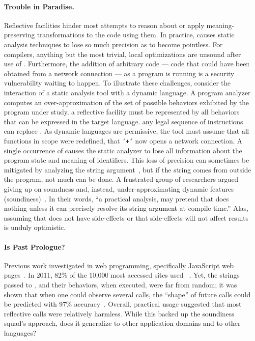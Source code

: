 \documentclass[screen,acmsmall]{acmart}%
\begin{document}
\paragraph{Trouble in Paradise.} Reflective facilities hinder
most attempts to reason about or apply meaning-preserving transformations to the
code using them. In practice, \eval causes static analysis techniques to lose so
much precision as to become pointless. For compilers, anything but the most
trivial, local optimizations are unsound after use of \eval. Furthermore, the
addition of arbitrary code --- code that could have been obtained from a network
connection --- as a program is running is a security vulnerability waiting to
happen. To illustrate these challenges, consider the interaction of a static
analysis tool with a dynamic language. A program analyzer computes an
over-approximation of the set of possible behaviors exhibited by the program
under study, a reflective facility must be represented by all behaviors that can
be expressed in the target language. \ie any legal sequence of instructions can
replace \eval. As dynamic languages are permissive, the tool must assume that
all functions in scope were redefined, \eg that \texttt{`+`} now opens a network
connection. A single occurrence of \eval causes the static analyzer to lose all
information about the program state and meaning of identifiers. This loss of
precision can sometimes be mitigated by analyzing the string
argument~\cite{moller03}, but if the string comes from outside the program, not
much can be done. A frustrated group of researchers argued giving up on
soundness and, instead, under-approximating dynamic features
(soundiness)~\cite{soundy}. In their words, ``a practical analysis, may pretend
that \eval does nothing unless it can precisely resolve its string argument at
compile time.'' Alas, assuming that \eval does not have side-effects or that
side-effects will not affect results is unduly optimistic.

\paragraph{Is Past Prologue?} Previous work investigated
\eval in web programming, specifically JavaScript web pages~\cite{pldi10a}. In
2011, 82\% of the 10,000 most accessed sites used \eval~\cite{ecoop11}. Yet, the
strings passed to \eval, and their behaviors, when executed, were far from
random; it was shown that when one could observe several calls, the ``shape'' of
future calls could be predicted with 97\% accuracy~\cite{oopsla12b}. Overall,
practical usage suggested that most reflective calls were relatively harmless.
While this backed up the soundiness squad's approach, does it generalize to
other application domains and to other languages?
\end{document}
